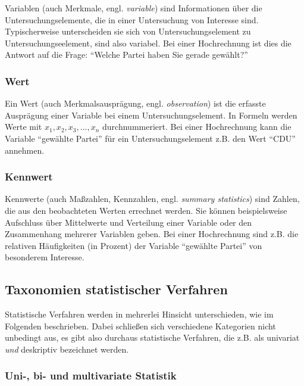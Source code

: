 \documentclass[
  11pt,
  ngerman,
  a4paper,
]{report}
\begin{document}
Variablen (auch Merkmale, engl. \emph{variable}) sind Informationen über die Untersuchungselemente, die in einer Untersuchung von Interesse sind. Typischerweise unterscheiden sie sich von Untersuchungselement zu Untersuchungseelement, sind also variabel. Bei einer Hochrechnung ist dies die Antwort auf die Frage: \enquote{Welche Partei haben Sie gerade gewählt?}

\hypertarget{wert}{%
\subsubsection{Wert}\label{wert}}

Ein Wert (auch Merkmalsausprägung, engl. \emph{observation}) ist die erfasste Ausprägung einer Variable bei einem Untersuchungselement. In Formeln werden Werte mit \(x_1, x_2, x_3, ..., x_n\) durchnummeriert. Bei einer Hochrechnung kann die Variable \enquote{gewählte Partei} für ein Untersuchungselement z.B. den Wert \enquote{CDU} annehmen.

\hypertarget{kennwert}{%
\subsubsection{Kennwert}\label{kennwert}}

Kennwerte (auch Maßzahlen, Kennzahlen, engl. \emph{summary statistics}) sind Zahlen, die aus den beobachteten Werten errechnet werden. Sie können beispielsweise Aufschluss über Mittelwerte und Verteilung einer Variable oder den Zusammenhang mehrerer Variablen geben. Bei einer Hochrechnung sind z.B. die relativen Häufigkeiten (in Prozent) der Variable \enquote{gewählte Partei} von besonderem Interesse.

\hypertarget{taxonomien-statistischer-verfahren}{%
\subsection{Taxonomien statistischer Verfahren}\label{taxonomien-statistischer-verfahren}}

Statistische Verfahren werden in mehrerlei Hinsicht unterschieden, wie im Folgenden beschrieben. Dabei schließen sich verschiedene Kategorien nicht unbedingt aus, es gibt also durchaus statistische Verfahren, die z.B. als univariat \emph{und} deskriptiv bezeichnet werden.

\hypertarget{uni--bi--und-multivariate-statistik}{%
\subsubsection{Uni-, bi- und multivariate Statistik}\label{uni--bi--und-multivariate-statistik}}
\end{document}
